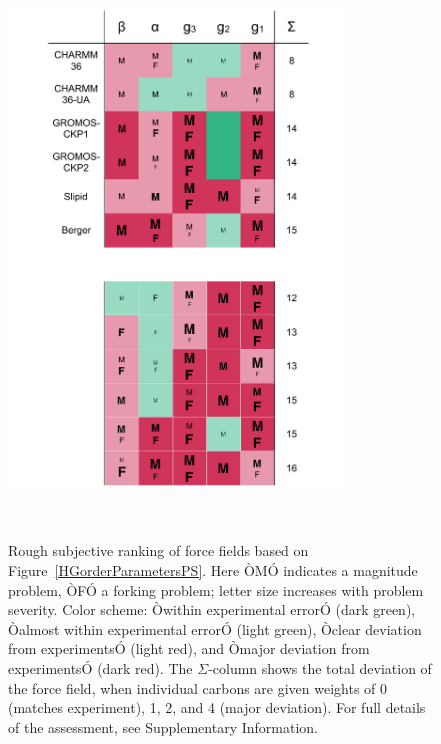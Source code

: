 \documentclass[aps,prl,superscriptaddress,twocolumn]{revtex4}
\begin{document}
\begin{figure}[]
  \centering
  \includegraphics[width=9.0cm]{../Figs/comparisonTablePS.pdf}
  \caption{\label{comparisonTablePS}
  Rough subjective ranking of force fields based on Figure~\ref{HGorderParametersPS}. Here ÒMÓ indicates a magnitude problem, ÒFÓ a forking problem; letter size increases with problem severity. Color scheme: Òwithin experimental errorÓ (dark green), Òalmost within experimental errorÓ (light green), Òclear deviation from experimentsÓ (light red), and Òmajor deviation from experimentsÓ (dark red). The $\Sigma$-column shows the total deviation of the force field, when individual carbons are given weights of 0 (matches experiment), 1, 2, and 4 (major deviation). For full details of the assessment, see Supplementary Information.
  }
   \\
\end{figure}
\end{document}
